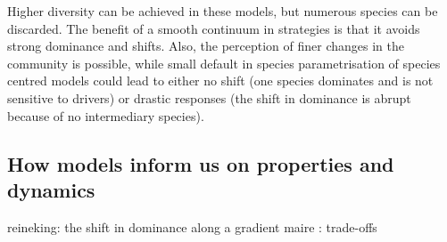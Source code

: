 Higher diversity can be achieved in these models, but numerous species can be discarded. The benefit of a smooth continuum in strategies is that it avoids strong dominance and shifts. Also, the perception of finer changes in the community is possible, while small default in species parametrisation of species centred models could lead to either no shift (one species dominates and is not sensitive to drivers) or drastic responses (the shift in dominance is abrupt because of no intermediary species). 




%



\subsection{How models inform us on properties and dynamics}

reineking: the shift in dominance along a gradient
maire : trade-offs

